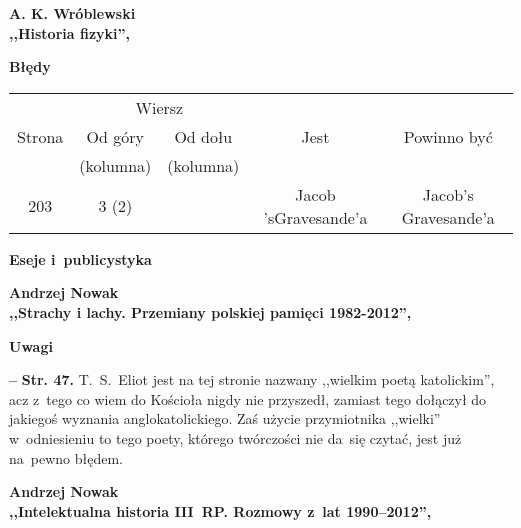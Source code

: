 \documentclass[a4paper,11pt]{article}  %
\newcommand{\spaceTwo}{2em}
\newcommand{\spaceThree}{1em}
\newcommand{\tb}{\textbf}
\newcommand{\noi}{\noindent}
\newcommand{\start}{\noi \tb{--} {}}
\newcommand{\Str}[1]{\tb{Str. #1.}}
\newcommand{\Center}[1]{\begin{center} #1 \end{center}}
\newcommand{\CenterTB}[1]{\Center{\tb{#1}}}
\newcommand{\Field}[1]{ \begin{center} {\Large \tb{#1} } \end{center} }
\newcommand{\Work}[1]{ \begin{center} {\large \tb{#1}} \end{center} }
\begin{document}
\vspace{\spaceTwo}





\Work{
  A. K. Wróblewski \\
  ,,Historia fizyki'', \cite{Wroblewski06} }


\CenterTB{Błędy}
\begin{center}
  \begin{tabular}{|c|c|c|c|c|}
    \hline
    & \multicolumn{2}{c|}{Wiersz} & & \\ \cline{2-3}
    Strona & Od góry & Od dołu & Jest & Powinno być \\
    & (kolumna) & (kolumna) & & \\ \hline
    203 & 3 (2) & & Jacob 'sGravesande'a & Jacob's Gravesande'a \\
    \hline
  \end{tabular}
\end{center}

\vspace{\spaceTwo}





\newpage
\Field{Eseje i~publicystyka}

\vspace{\spaceTwo} \vspace{\spaceThree}



\Work{
  Andrzej Nowak \\
  ,,Strachy i lachy. Przemiany polskiej pamięci 1982-2012'',
  \cite{Nowak12} }


\CenterTB{Uwagi}

\start \Str{47} T.~S.~Eliot jest na tej stronie nazwany ,,wielkim
poetą katolickim'', acz z~tego co wiem do Kościoła nigdy nie
przyszedł, zamiast tego dołączył do jakiegoś wyznania
anglokatolickiego. Zaś użycie przymiotnika ,,wielki'' w~odniesieniu to
tego poety, którego twórczości nie da~się czytać, jest już na~pewno
błędem.

\vspace{\spaceTwo}





\Work{
  Andrzej Nowak \\
  ,,Intelektualna historia III~RP. Rozmowy z~lat 1990--2012'',
  \cite{Nowak13} }
\end{document}
